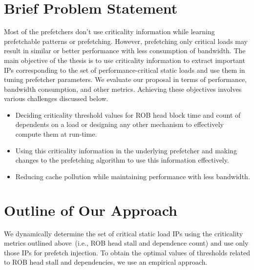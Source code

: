 \section{Brief Problem Statement}

Most of the prefetchers don’t use criticality information while learning prefetchable patterns or prefetching. However, prefetching only critical loads may result in similar or better performance with less consumption of bandwidth.
The main objective of the thesis is to use criticality information to extract important IPs corresponding to the set of performance-critical static loads and use them in tuning prefetcher parameters. We evaluate our proposal in terms of performance, bandwidth consumption, and other metrics. Achieving these objectives
involves various challenges discussed below. 
\begin{itemize}
\item Deciding criticality threshold values for ROB head block time and count of dependents on a load or designing any other mechanism to effectively compute them at run-time.

\item Using this criticality information in the underlying prefetcher and making changes to the prefetching algorithm to use this information effectively.

\item Reducing cache pollution while maintaining performance with less bandwidth.

 \end{itemize}
 
 \section{Outline of Our Approach}
 
We dynamically determine the set of critical static load IPs using the criticality metrics outlined above~(i.e., ROB head stall and dependence count) and use only those IPs for prefetch injection.
To obtain the optimal values of thresholds related to ROB head stall and dependencies, we use an empirical approach.

